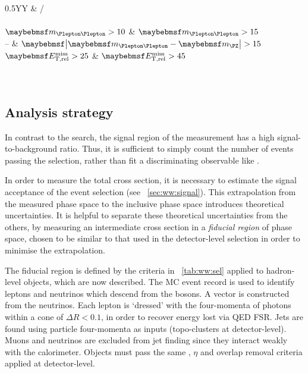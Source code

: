 \begin{description}
	\begin{table}[b]
		\begin{tabularx}{0.5\textwidth}{YY}
			\toprule
			\emch & \eech/\mmch \\
			\midrule
			 \\
			$\mll > 10$    & $\mll > 15$ \\
			--             & $\mods{\mll - \mZ} > 15$ \\
			$\calometrel > 25$ & $\calometrel > 45$ \\
			 \\
			 \\
			\bottomrule
		\end{tabularx}
		\caption{Summary of \WW event selection. Cuts are given in \GeV. The relevant observables are described in \Chapter~\ref{chap:selection}.}
		\label{tab:ww:sel}
	\end{table}

\end{description}



\subsection{Analysis strategy}

In contrast to the \HWW search, the signal region of the \WW measurement has a high 
signal-to-background ratio. Thus, it is sufficient to simply count the number of events 
passing the selection, rather than fit a discriminating observable like \mt.

In order to measure the total \WW cross section, it is necessary to estimate the signal 
acceptance of the event selection (see \Section~\ref{sec:ww:signal}). This extrapolation 
from the measured phase space to the inclusive phase space introduces theoretical 
uncertainties. It is helpful to separate these theoretical uncertainties from the others, 
by measuring an intermediate cross section in a \textit{fiducial region} of phase space, 
chosen to be similar to that used in the detector-level selection in order to minimise 
the extrapolation.

The fiducial region is defined by the criteria in \Table~\ref{tab:ww:sel} applied to 
hadron-level objects, which are now described. The MC event record is used to identify 
leptons and neutrinos which descend from the \PW bosons. A \truthmetvec vector is constructed 
from the neutrinos. Each lepton is `dressed' with the four-momenta of photons within a 
cone of $\Delta R < 0.1$, in order to recover energy lost via QED FSR. Jets are found 
using particle four-momenta as inputs (\cf topo-clusters at detector-level). Muons and 
neutrinos are excluded from jet finding since they interact weakly with the calorimeter. 
Objects must pass the same \pt, $\eta$ and overlap removal criteria applied at 
detector-level.

